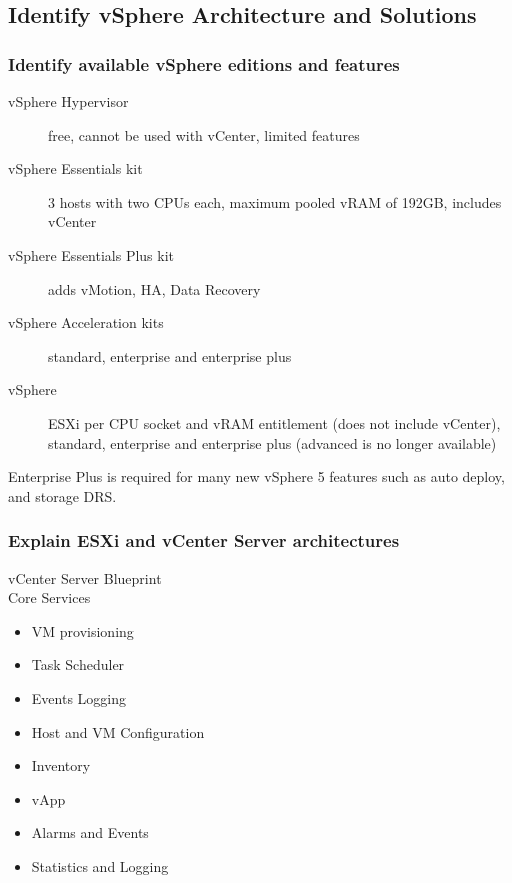 \subsection{Identify vSphere Architecture and Solutions}

\subsubsection{Identify available vSphere editions and features}

\begin{description}

\item[vSphere Hypervisor]
free, cannot be used with vCenter, limited features

\item[vSphere Essentials kit]
3 hosts with two CPUs each, maximum pooled vRAM of 192GB, includes vCenter

\item[vSphere Essentials Plus kit]
adds vMotion, HA, Data Recovery

\item[vSphere Acceleration kits]
standard, enterprise and enterprise plus

\item[vSphere]
ESXi per CPU socket and vRAM entitlement (does not include vCenter), standard,
enterprise and enterprise plus (advanced is no longer available)

\end{description}

Enterprise Plus is required for many new vSphere 5 features such as auto deploy,
and storage DRS.

\subsubsection{Explain ESXi and vCenter Server architectures}

vCenter Server Blueprint\\

Core Services

\begin{itemize}
\item VM provisioning
\item Task Scheduler
\item Events Logging
\item Host and VM Configuration
\item Inventory
\item vApp
\item Alarms and Events
\item Statistics and Logging
\end{itemize}

